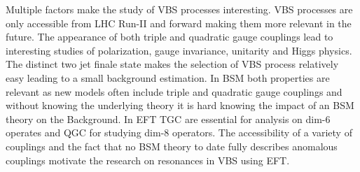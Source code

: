 \documentclass[../Bachelorarbeit.tex]{subfiles}
\begin{document}
Multiple factors make the study of VBS processes interesting. VBS processes are only accessible from LHC Run-II and forward making them more relevant in the future.
The appearance of both triple and quadratic gauge couplings lead to interesting studies of polarization, gauge invariance, unitarity and Higgs physics.
The distinct two jet finale state makes the selection of VBS process relatively easy leading to a small background estimation. In BSM both properties
are relevant as new models often include triple and quadratic gauge couplings and without knowing the underlying theory it is hard knowing the impact of an BSM theory on the Background.
In EFT TGC are essential for analysis on dim-6 operates and QGC for studying dim-8 operators. The accessibility of a variety of couplings and
the fact that no BSM theory to date fully describes anomalous couplings motivate the research on resonances in VBS using EFT.
\end{document}
